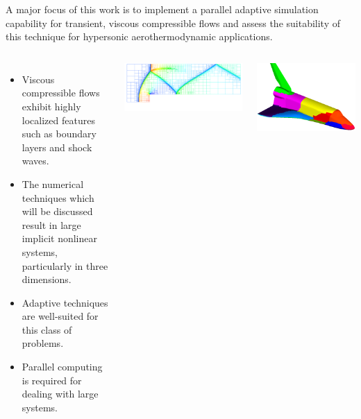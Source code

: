 \documentclass[compress,11pt]{beamer}
\begin{document}
{
  \begin{block}{}
    \begin{center}
      A major focus of this work is to implement a parallel adaptive simulation capability for transient, viscous compressible flows and assess the suitability of this technique for hypersonic aerothermodynamic applications.
    \end{center}
  \end{block}
    
  \begin{columns}[t]
    \small
    \begin{itemize}
      \item Viscous compressible flows exhibit highly localized features such as boundary layers and shock waves.
      \item The numerical techniques which will be discussed result in large implicit nonlinear systems, particularly in three dimensions.
      \item Adaptive techniques are well-suited for this class of problems.
      \item Parallel computing is required for dealing with large systems.
    \end{itemize}
    

    \includegraphics[width=\textwidth]{figures/wt_m3_p_mesh}
    
    \includegraphics[width=\textwidth]{figures/orbiter_surface}

  \end{columns}
}
\end{document}
